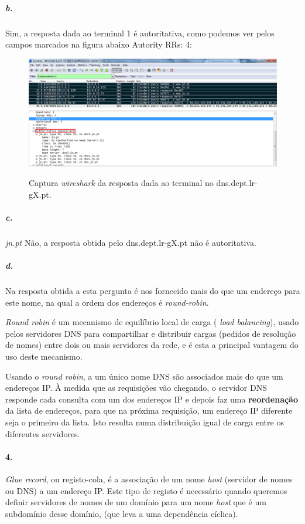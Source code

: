 \subparagraph{b.}
Sim, a resposta dada ao terminal 1 é autoritativa, como podemos ver pelos campos marcados na figura abaixo \textsf{Autority RRs: 4}:

\begin{figure}[h]
\centering
\includegraphics[width=1\textwidth, height=0.35\textheight]{3b_cap.png}
\label{fig:2-capturaWireshark}
\caption{Captura \emph{wireshark} da resposta dada ao terminal no \textsf{dns.dept.lr-gX.pt}.}
\end{figure}


\subparagraph{c.} \textsf{\textit{jn.pt}}	
Não, a resposta obtida pelo \textsf{dns.dept.lr-gX.pt} não é autoritativa. 


\subparagraph{d.}
Na resposta obtida a esta pergunta é nos fornecido mais do que um endereço para 
este nome, na qual a ordem dos endereços é \emph{round-robin}.

\emph{Round robin} é um mecanismo de equilíbrio local de carga (\emph{ load balancing}),
usado pelos servidores DNS  para compartilhar e distribuir cargas (pedidos de resolução 
de nomes) entre dois ou mais servidores da rede, e é esta a principal vantagem do uso 
deste mecanismo.

Usando o \emph{round robin}, a um único nome DNS são associados mais do que um 
endereços IP. À medida que as requisições vão chegando, o servidor DNS responde cada 
consulta com um dos endereços IP e depois faz uma \textbf{reordenação} da lista de endereços, para que na próxima requisição, um endereço IP diferente seja o primeiro 
da lista. Isto resulta numa distribuição igual de carga entre os diferentes servidores.


\paragraph{4.}
\emph{Glue record}, ou registo-cola, é a associação de um nome \emph{host} (servidor de nomes ou DNS) a um endereço IP.
Este tipo de registo é necessário quando queremos definir servidores de nomes de um domínio para um nome \emph{host} que é um subdomínio desse domínio, (que leva a uma dependência cíclica).

